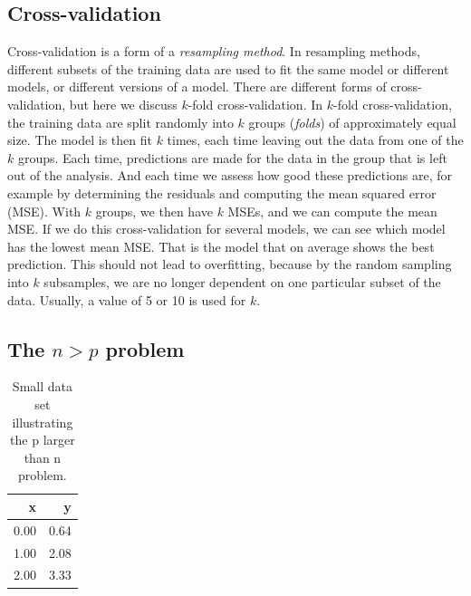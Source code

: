 \documentclass[]{book}\usepackage[]{graphicx}\usepackage[]{color}
\begin{document}
\subsection{Cross-validation}
Cross-validation is a form of a \textit{resampling method}. In resampling methods, different subsets of the training data are used to fit the same model or different models, or different versions of a model. There are different forms of cross-validation, but here we discuss $k$-fold cross-validation. In $k$-fold cross-validation, the training data are split randomly into $k$ groups (\textit{folds}) of approximately equal size. The model is then fit $k$ times, each time leaving out the data from one of the $k$ groups. Each time, predictions are made for the data in the group that is left out of the analysis. And each time we assess how good these predictions are, for example by determining the residuals and computing the mean squared error (MSE). With $k$ groups, we then have $k$ MSEs, and we can compute the mean MSE. If we do this cross-validation for several models, we can see which model has the lowest mean MSE. That is the model that on average shows the best prediction. This should not lead to overfitting, because by the random sampling into $k$ subsamples, we are no longer dependent on one particular subset of the data. Usually, a value of 5 or 10 is used for $k$.



\subsection{The $n>p$ problem}

\begin{table}[ht]
\centering
\caption{Small data set illustrating the p larger than n problem.} 
\label{tab:np}
\begin{tabular}{rr}
  \hline
x & y \\ 
  \hline
0.00 & 0.64 \\ 
  1.00 & 2.08 \\ 
  2.00 & 3.33 \\ 
   \hline
\end{tabular}
\end{table}
\end{document}
